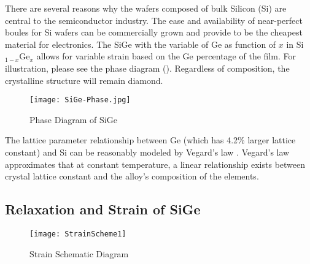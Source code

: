 There are several reasons why the wafers composed of bulk Silicon (Si) are central to the semiconductor industry.  The ease and availability of near-perfect boules for Si wafers can be commercially grown and provide to be the cheapest material for electronics.  The SiGe with the variable of Ge as function of $x$ in Si$_{1-x}$Ge$_x$ allows for variable strain based on the Ge percentage of the film.  For illustration, please see the phase diagram ().  Regardless of composition, the crystalline structure will remain diamond.
 \begin{figure}
\caption{Phase Diagram of SiGe \cite{Fig2-2}}
\label{SiGePhase}
\centering
\texttt{[image: SiGe-Phase.jpg]}
\end{figure} 
 The lattice parameter relationship between Ge (which has 4.2\% larger lattice constant) and Si can be reasonably modeled by Vegard's law \cite{Denton1}.  Vegard's law approximates that at constant temperature, a linear relationship exists between crystal lattice constant and the alloy's composition of the elements.

\subsection{Relaxation and Strain of SiGe}

\begin{figure}[ht]
\caption{Strain Schematic Diagram \cite{Paul1} }
\label{StrainSch}
\begin{minipage}{\linewidth}
\texttt{[image: StrainScheme1]}
\end{minipage}
\end{figure}

